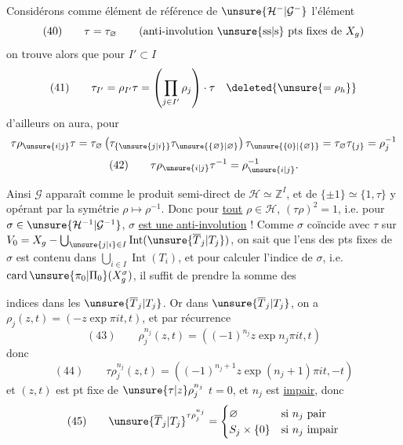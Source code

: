 
Considérons comme élément de référence de $\unsure{\mathcal H^{-}|\mathcal G^{-}}$ l'élément
\[
(40)\qquad \tau=\tau_{\varnothing}\qquad
\text{(anti-involution \unsure{ss|s} pts fixes de $X_g$)}
\]
on trouve alors  que pour $I'\subset I$
\[
(41)\qquad \tau_{I'}=\rho_{I'}\tau=
\left(\prod_{j\in I'}\rho_j\right)\cdot\tau\quad
\deleted{\unsure{=\rho_h}}
\]
d'ailleurs on aura, pour 
\[
\tau\rho_{\unsure{i|j}}\tau
=\tau_{\varnothing}\left(\tau_{\{\unsure{j|i}\}}\tau_{\unsure{\{\varnothing\}|\varnothing}}\right)
\tau_{\unsure{\{0\}|\{\varnothing\}}}
=\tau_{\varnothing}\tau_{\{j\}}=\rho_j^{-1}
\]
\[
(42)\qquad \tau\rho_{\unsure{i|j}}\tau^{-1}=\rho_{\unsure{i|j}}^{-1}.
\]

Ainsi $\mathcal G$ apparaît comme le produit semi-direct de $\mathcal H\simeq\mathbb Z^I$, et de
$\{\pm1\}\simeq\{1,\tau\}$ y opérant par la symétrie
$\rho\longmapsto\rho^{-1}$. Donc pour \uline{tout} $\rho\in\mathcal H$,
$(\tau\rho)^2=1$, i.e. pour 
$\sigma\in\unsure{\mathcal H^{-1}|\mathcal G^{-1}}$,
$\sigma$  \uline{est une anti-involution} !
Comme $\sigma$ coïncide avec $\tau$ sur
$V_0=X_g-\bigcup_{\unsure{j|i}\in I}\operatorname{Int}(\unsure{\overline T_j|T_j})$,
on sait que l'ens des pts fixes de $\sigma$ est contenu dans
$\bigcup_{i\in I}\operatorname{Int}(T_i)$, et pour calculer l'indice de $\sigma$,
i.e. $\operatorname{card}\unsure{\pi_0|\Pi_0}(X_g^\sigma)$, il suffit de prendre la somme des


indices dans les $\unsure{\overline T_j|T_j}$. Or dans $\unsure{\overline T_j|T_j}$, on a 
$\rho_j(z,t)=(-z\exp\pi it,t)$, et par récurrence
\[
(43)\qquad \rho_j^{n_j}(z,t)=\left((-1)^{n_j}z\exp n_j\pi it,t\right)
\]
donc
\[
(44)\qquad \tau\rho_j^{n_j}(z,t)=
\left((-1)^{n_j+1}z\exp(n_j+1)\pi it,-t\right)
\]
et  $(z,t)$ est pt fixe de
$\unsure{\tau|z}\rho_j^{n_j}$ 
$t=0$,  et $n_j$ est \uline{impair}, donc
\[
(45)\qquad \unsure{\overline T_j|T_j}^{\tau\rho_j^{n_j}}=
\begin{cases}
\varnothing&\text{si $n_j$ pair}\\
S_j\times\{0\}&\text{si $n_j$ impair}
\end{cases}
\]

